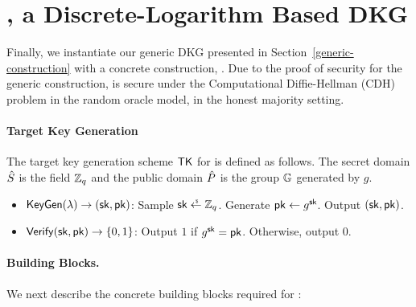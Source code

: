 \section{\RG, a Discrete-Logarithm Based DKG} \label{storm-gen}
Finally, we instantiate our generic DKG presented in Section~\ref{generic-construction} with a concrete construction, \RG.
Due to the proof of security for the generic construction,
\RG is secure under the Computational Diffie-Hellman (CDH) problem in the random oracle model,
 in the honest majority setting.



\paragraph{Target Key Generation}
The target key generation scheme $\mathsf{TK}$ for \RG is defined as follows.
The secret domain $\hat{S}$ is the field $\mathbb{Z}_q$ and the public domain $\hat{P}$ is the group $\mathbb{G}$ generated by $g$.
\begin{itemize}
  \item $\mathsf{KeyGen}(\lambda) \rightarrow (\mathsf{sk}, \mathsf{pk})$: Sample $\SK \rgets \Zq$. Generate $\mathsf{pk} \gets g^{\mathsf{sk}}$. Output $(\mathsf{sk}, \mathsf{pk})$.
  \item $\mathsf{Verify}(\mathsf{sk}, \mathsf{pk}) \rightarrow \{ 0, 1\}$: Output $1$ if $g^{\mathsf{sk}} = \mathsf{pk}$. Otherwise, output $0$.
\end{itemize}

\paragraph{Building Blocks.}
We next describe the concrete building blocks required for \RG:

